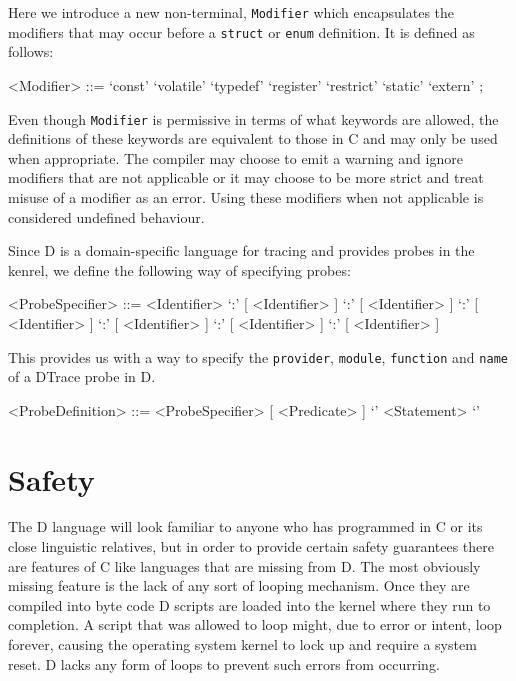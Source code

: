 \noindent
Here we introduce a new non-terminal, \texttt{Modifier} which encapsulates the
modifiers that may occur before a \texttt{struct} or \texttt{enum} definition.
It is defined as follows:

\begin{grammar}
<Modifier> ::= `const'
	\alt `volatile'
	\alt `typedef'
	\alt `register'
	\alt `restrict'
	\alt `static'
	\alt `extern' ;
\end{grammar}

\noindent
Even though \texttt{Modifier} is permissive in terms of what keywords are
allowed, the definitions of these keywords are equivalent to those in C and may
only be used when appropriate. The compiler may choose to emit a warning and
ignore modifiers that are not applicable or it may choose to be more strict and
treat misuse of a modifier as an error. Using these modifiers when not
applicable is considered undefined behaviour. \newline

\noindent
Since D is a domain-specific language for tracing and provides probes in the
kenrel, we define the following way of specifying probes:

\begin{grammar}
<ProbeSpecifier> ::= <Identifier>
	\alt [ <Identifier> ] `:' [ <Identifier> ]
	\alt [ <Identifier> ] `:' [ <Identifier> ] `:' [ <Identifier> ]
	\alt [ <Identifier> ] `:' [ <Identifier> ] `:'
	[ <Identifier> ] `:' [ <Identifier> ]
\end{grammar}

\noindent
This provides us with a way to specify the \texttt{provider}, \texttt{module},
\texttt{function} and \texttt{name} of a DTrace probe in D.

\begin{grammar}
<ProbeDefinition> ::= <ProbeSpecifier> [ <Predicate> ] `{'  { <Statement> } `}'
\end{grammar}


\section{Safety}
\label{sec:safety}

The D language will look familiar to anyone who has programmed in C or
its close linguistic relatives, but in order to provide certain
safety guarantees there are features of C like languages that are
missing from D.  The most obviously missing feature is the lack of any
sort of looping mechanism.  Once they are compiled into byte code D
scripts are loaded into the kernel where they run to completion.  A
script that was allowed to loop might, due to error or intent, loop
forever, causing the operating system kernel to lock up and require a
system reset.  D lacks any form of loops to prevent such errors from
occurring.

